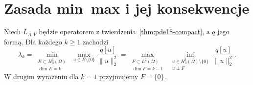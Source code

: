 \section{Zasada min--max i jej konsekwencje}
\label{sec:pde18-minmax}
\begin{twierdzenie}
\label{thm:pde18-minmax}
Niech $L_{A,V}$ będzie operatorem z
twierdzenia~\ref{thm:pde18-compact}, a $q$ jego formą.
Dla każdego $k\ge1$ zachodzi
\begin{equation}\label{eq:pde18-minmax}
 \lambda_k=\min_{\substack{E\subset H_0^1(\Omega)\\\dim E=k}}
 \ \max_{u\in E\setminus\{0\}}\frac{q[u]}{\|u\|_2^2}
 =\max_{\substack{F\subset L^2(\Omega)\\\dim F=k-1}}
 \ \inf_{\substack{u\in H_0^1(\Omega)\setminus\{0\}\\u\perp F}}
 \frac{q[u]}{\|u\|_2^2}.
\end{equation}
W drugim wyrażeniu dla $k=1$ przyjmujemy $F=\{0\}$.
\end{twierdzenie}
